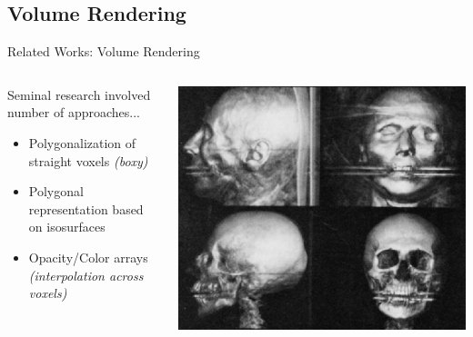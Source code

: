 \documentclass[10pt,compress,professionalfont]{beamer}
\begin{document}
\subsection{Volume Rendering}
\begin{frame}{Related Works: Volume Rendering}

    \begin{columns}
        \begin{column}{0.6\textwidth}

    \vspace{-10mm}

    Seminal research involved number of approaches...
    
    \begin{itemize}
        \item Polygonalization of straight voxels \textit{(boxy)}\\
        \vspace{4mm}

        \item Polygonal representation based on isosurfaces\\
        \vspace{4mm}

        \item Opacity/Color arrays \textit{(interpolation across voxels)}\\
    \end{itemize}

        \end{column}
        \begin{column}{0.4\textwidth}
            \vspace{-4mm}
            \includegraphics[width=\textwidth]{../img/external/img188}\\
        \end{column}
    \end{columns}
\end{frame}
\end{document}
